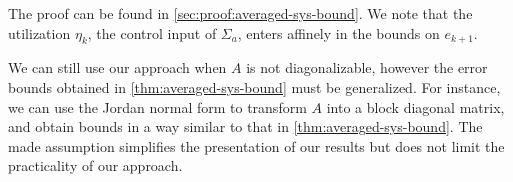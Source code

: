 
The proof can be found in \cref{sec:proof:averaged-sys-bound}.
We note that the utilization $\eta_{k}$, \ie the control input of $\Sigma_{a}$, enters affinely in the bounds on $e_{k+1}$.

\begin{remark}
We can still use our approach when $A$ is not
diagonalizable, however the error bounds obtained in
\cref{thm:averaged-sys-bound} must be generalized. For instance, we can
use the Jordan normal form to transform $A$ into a block diagonal
matrix, and obtain bounds in a way similar to that in
\cref{thm:averaged-sys-bound}. The made assumption simplifies the
presentation of our results but does not limit the practicality of our
approach. %
\end{remark}

